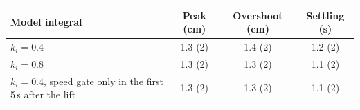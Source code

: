 \begin{tabularx}{\textwidth}{Xccc}
\toprule
Model integral & Peak (cm) & Overshoot (cm) & Settling (s) \\
\midrule
$k_i = 0.4$ & 1.3 (2) & 1.4 (2) & 1.2 (2) \\
$k_i = 0.8$ & 1.3 (2) & 1.3 (2) & 1.1 (2) \\
$k_i = 0.4$, speed gate only in the first 5\,s after the lift & 1.3 (2) & 1.3 (2) & 1.1 (2) \\
\bottomrule
\end{tabularx}
